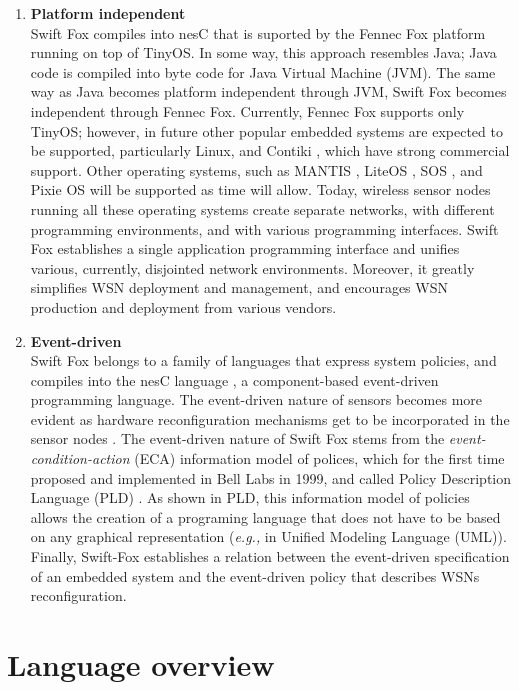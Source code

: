 \documentclass[11pt]{article}
\begin{document}
\begin{enumerate}
	\item \textbf{Platform independent}	\\
	Swift Fox compiles into nesC \cite{gay:2003} that is suported 
	by the Fennec Fox platform running on top of TinyOS. In some way,
	this approach resembles Java; Java code  is compiled into byte code
	for Java Virtual Machine (JVM). The same way as Java becomes
	platform independent through JVM, Swift Fox becomes independent
	through Fennec Fox. Currently, Fennec Fox supports only TinyOS;
	however, in future other popular embedded systems are expected to
	be supported, particularly Linux, and Contiki \cite{dunkels:2004a},
	which have strong commercial support. Other operating systems,
	such as MANTIS \cite{bhatti:2005}, LiteOS \cite{cao:2008}, SOS
	\cite{han:2005}, and Pixie OS \cite{lorincz:2008} will be supported
	as time will allow. Today, wireless sensor nodes running all these 
	operating systems create separate networks, with different
	programming environments, and with various programming interfaces.
	Swift Fox establishes a single application programming interface
	and unifies various, currently, disjointed network environments.
	Moreover, it greatly simplifies WSN deployment and management, and 
	encourages WSN production and deployment from various vendors.  

	\item \textbf{Event-driven}		\\
	Swift Fox belongs to a family of languages that express system
	policies, and compiles into the nesC language \cite{gay:2003}, a
	component-based event-driven programming language. The event-driven
	nature of sensors becomes more evident as hardware reconfiguration
	mechanisms get to be incorporated in the sensor nodes
	\cite{kateeb:2009}. The event-driven nature of Swift Fox stems from
	the \textit{event-condition-action} (ECA) information model of
	polices, which for the first time proposed and implemented in Bell 
	Labs in 1999, and called Policy Description Language (PLD)
	\cite{Lobo:1999:PDL:315149.315308}. As shown in PLD, this
	information model of policies allows the creation of a programing
	language that does not have to be based on any graphical
	representation (\textit{e.g.,} in Unified Modeling Language (UML)).
	Finally, Swift-Fox establishes a relation between the event-driven
	specification of an embedded system and the event-driven policy
	that describes WSNs reconfiguration.
\end{enumerate}


\section{Language overview}
\end{document}
